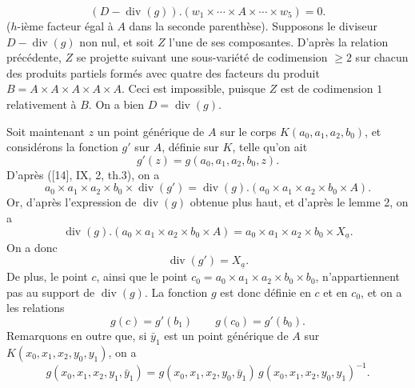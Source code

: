 \[
(D-\operatorname{div}(g)).(w_1\times\cdots\times A\times\cdots\times w_5)=0.
\]
($h$-ième facteur égal à $A$ dans la seconde parenthèse). Supposons le diviseur $D-\operatorname{div}(g)$ non nul, et soit $Z$ l'une de ses composantes. D'après la relation précédente, $Z$ se projette suivant une sous-variété de codimension $\geq2$ sur chacun des produits partiels formés avec quatre des facteurs du produit $B=A\times A\times A\times A\times A$. Ceci est impossible, puisque $Z$ est de codimension $1$ relativement à $B$. On a bien $D=\operatorname{div}(g)$.

Soit maintenant $z$ un point générique de $A$ sur le corps $K(a_0,a_1,a_2,b_0)$, et considérons la fonction $g'$ sur $A$, définie sur $K$, telle qu'on ait
\[
g'(z)=g(a_0,a_1,a_2,b_0,z).
\]
D'après ([14], IX, 2, th.3), on a
\[
a_0\times a_1\times a_2\times b_0\times\operatorname{div}(g')=\operatorname{div}(g).(a_0\times a_1\times a_2\times b_0\times A).
\]
Or, d'après l'expression de $\operatorname{div}(g)$ obtenue plus haut, et d'après le lemme 2, on a
\[
\operatorname{div}(g).(a_0\times a_1\times a_2\times b_0\times A)=a_0\times a_1\times a_2\times b_0\times X_{\underline{a}}.
\]
On a donc
\[
\operatorname{div}(g')=X_{\underline{a}}.
\]
De plus, le point $c$, ainsi que le point $c_0=a_0\times a_1\times a_2\times b_0\times b_0$, n'appartiennent pas au support de $\operatorname{div}(g)$. La fonction $g$ est donc définie en $c$ et en $c_0$, et on a les relations
\[
g(c)=g'(b_1)\qquad g(c_0)=g'(b_0).
\]
Remarquons en outre que, si $\bar{y}_1$ est un point générique de $A$ sur $K(x_0,x_1,x_2,y_0,y_1)$, on a
\[
g(x_0,x_1,x_2,y_1,\bar{y}_1)=g(x_0,x_1,x_2,y_0,\bar{y}_1)\,g(x_0,x_1,x_2,y_0,y_1)^{-1}.
\]
